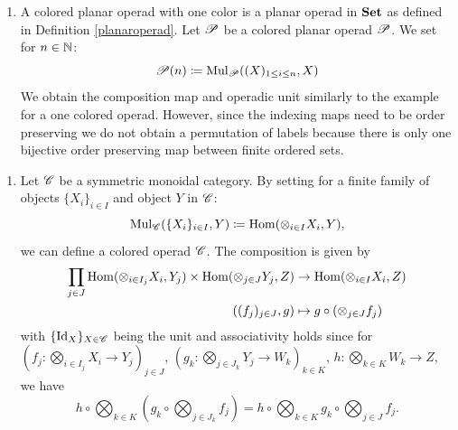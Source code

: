 \begin{egs}
\begin{enumerate}
        \item A colored planar operad with one color is a planar operad in
        $\Set$ as defined in Definition \ref{planaroperad}. Let $\P$ be a
        colored planar operad $\P$. We set for $n \in \N$:
        \[
         \P(n) \coloneqq \Mul_{\P}((X)_{1\leq i \leq n}, X)
        \]
        We obtain the composition map and operadic unit similarly to the example
        for a one colored operad. However, since the indexing maps need to be
        order preserving we do not obtain a permutation of labels because
        there is only one bijective order preserving map between finite ordered
        sets.
    \end{enumerate}
\end{egs}

\begin{egs}
    \begin{enumerate}
        \item Let $\C$ be a symmetric monoidal category. By setting for a finite
        family of objects $\{X_i\}_{i \in I}$ and object $Y$ in $\C$:
        \[
            \Mul_{\C}(\{X_i\}_{i \in I}, Y) \coloneqq \Hom(\otimes_{i \in I} X_i, Y),
        \]
        we can define a colored operad $\C$. The composition is given by
        \begin{align*}
            \prod_{j \in J} \Hom(\otimes_{i \in I_j} X_i, Y_j) \times \Hom(\otimes_{j \in J} Y_j, Z) &\to \Hom(\otimes_{i \in I} X_i, Z) \\
            ((f_j)_{j \in J}, g) &\mapsto g \circ (\otimes_{j \in J} f_j) \\
        \end{align*}
        with $\{ \id_X\}_{X \in \C}$ being the unit and associativity holds
        since for $(f_j \colon \bigotimes_{i \in I_j} X_i \to Y_j)_{j \in J}$,
        $(g_k \colon \bigotimes_{j \in J_k} Y_j \to W_k)_{k \in K}$, $h \colon
        \bigotimes_{k \in K} W_k \to Z$, we have
        \[
            h \circ \bigotimes_{k \in K} \left(g_k \circ \bigotimes_{j \in J_k} f_j\right) = h \circ \bigotimes_{k \in K} g_k \circ \bigotimes_{j \in J} f_j.
        \]
    

\end{enumerate}
\end{egs}
